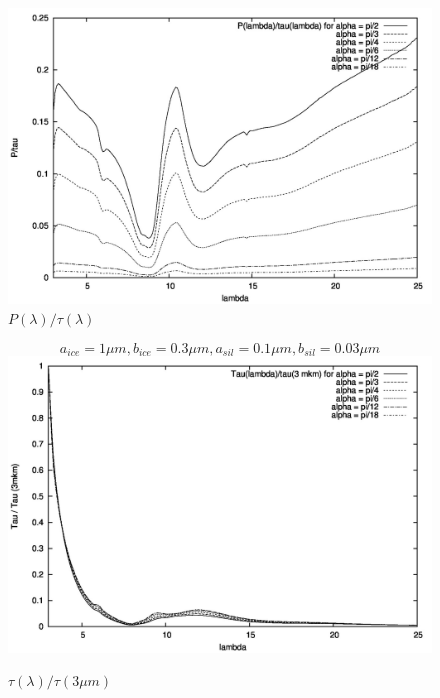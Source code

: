 \documentclass[a4paper,10pt]{article}
\begin{document}
\begin{figure}[p]
 \includegraphics{../plots/P-to-tau-1-07.jpg}
 \caption{$P(\lambda)/\tau(\lambda)$ }
\end{figure}


\begin{figure}[p]
 $$a_{ice} = 1 \mu m,b_{ice} = 0.3 \mu m , a_{sil} = 0.1 \mu m , b_{sil} = 0.03  \mu m $$
 \includegraphics{../plots/tau-1-03.jpg}
 \caption{$\tau(\lambda)/\tau(3\mu m)$ }
\end{figure}
\end{document}
